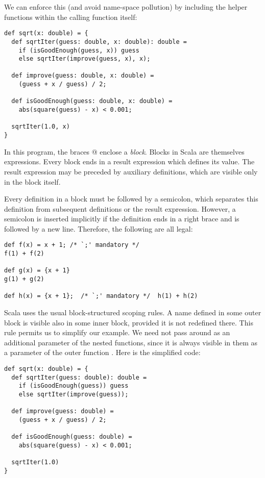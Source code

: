 \documentclass[11pt]{book}
\begin{document}
We can enforce this (and avoid name-space pollution) by including
the helper functions within the calling function itself:
\begin{verbatim}
def sqrt(x: double) = {
  def sqrtIter(guess: double, x: double): double = 
    if (isGoodEnough(guess, x)) guess
    else sqrtIter(improve(guess, x), x);

  def improve(guess: double, x: double) = 
    (guess + x / guess) / 2;

  def isGoodEnough(guess: double, x: double) = 
    abs(square(guess) - x) < 0.001;

  sqrtIter(1.0, x)
}
\end{verbatim}
In this program, the braces @ enclose a {\em block}.
Blocks in Scala are themselves expressions.  Every block ends in a
result expression which defines its value.  The result expression may
be preceded by auxiliary definitions, which are visible only in the
block itself.

Every definition in a block must be followed by a semicolon, which
separates this definition from subsequent definitions or the result
expression. However, a semicolon is inserted implicitly if the
definition ends in a right brace and is followed by a new line.
Therefore, the following are all legal:
\begin{verbatim}
def f(x) = x + 1; /* `;' mandatory */
f(1) + f(2)

def g(x) = {x + 1}
g(1) + g(2)

def h(x) = {x + 1};  /* `;' mandatory */  h(1) + h(2)
\end{verbatim}
Scala uses the usual block-structured scoping rules. A name defined in
some outer block is visible also in some inner block, provided it is
not redefined there. This rule permits us to simplify our
\verb@sqrt@ example. We need not pass \verb@x@ around as an additional parameter of
the nested functions, since it is always visible in them as a
parameter of the outer function \verb@sqrt@. Here is the simplified code:
\begin{verbatim}
def sqrt(x: double) = {
  def sqrtIter(guess: double): double = 
    if (isGoodEnough(guess)) guess
    else sqrtIter(improve(guess));

  def improve(guess: double) = 
    (guess + x / guess) / 2;

  def isGoodEnough(guess: double) = 
    abs(square(guess) - x) < 0.001;

  sqrtIter(1.0)
}
\end{verbatim}
\end{document}
